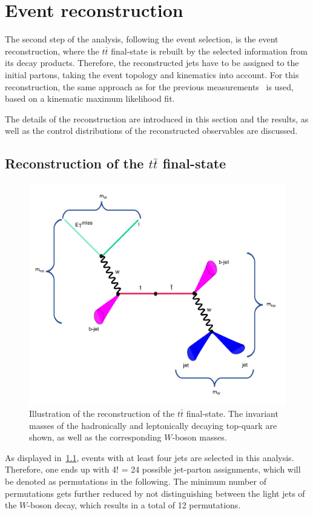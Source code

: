 \chapter{Event reconstruction}\label{ch5}
The second step of the analysis, following the event selection, is the event reconstruction, where the $t\bar{t}$ final-state is rebuilt by the selected information from its decay products. Therefore, the reconstructed jets have to be assigned to the initial partons, taking the event topology and kinematics into account. For this reconstruction, the same approach as for the previous measurements~\cite{Aad:2015nba, ATLAS-CONF-2017-071} is used, based on a kinematic maximum likelihood fit. 

The details of the reconstruction are introduced in this section and the results, as well as the control distributions of the reconstructed observables are discussed.  


\section{Reconstruction of the $t\bar{t}$ final-state}
\begin{figure}[h]
	\centering
	\includegraphics[width=0.65\linewidth]{Pics/cp5/51}
	\caption{ Illustration of the reconstruction of the $t\bar{t}$ final-state. The  invariant masses of the hadronically and leptonically decaying top-quark are shown, as well as the corresponding $W$-boson masses. } 
	\label{fig:51}
\end{figure}

As displayed in~\cref{fig:51}, events with at least four jets are selected in this analysis. Therefore, one ends up with 4! = 24 possible jet-parton assignments, which will be denoted as permutations in the following. The minimum number of permutations gets further reduced by not distinguishing between the light jets of the $W$-boson decay, which results in a total of 12 permutations. 

